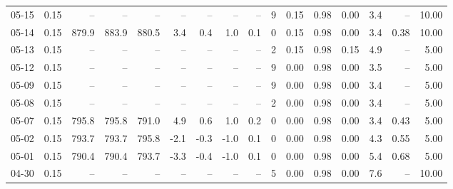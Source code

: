 \begin{threeparttable}
{\begin{tabular}{lrrrrrrrrrrrrrrr}
  05-15 &     0.15 &    -- &    -- &    -- &         -- &             -- &                       -- &                  -- &              9 &       0.15 &      0.98 &           0.00 &              3.4 &              -- &                  10.00 \\
  05-14 &     0.15 & 879.9 & 883.9 & 880.5 &        3.4 &            0.4 &                      1.0 &                 0.1 &              0 &       0.15 &      0.98 &           0.00 &              3.4 &            0.38 &                  10.00 \\
  05-13 &     0.15 &    -- &    -- &    -- &         -- &             -- &                       -- &                  -- &              2 &       0.15 &      0.98 &           0.15 &              4.9 &              -- &                   5.00 \\
  05-12 &     0.15 &    -- &    -- &    -- &         -- &             -- &                       -- &                  -- &              9 &       0.00 &      0.98 &           0.00 &              3.5 &              -- &                   5.00 \\
  05-09 &     0.15 &    -- &    -- &    -- &         -- &             -- &                       -- &                  -- &              9 &       0.00 &      0.98 &           0.00 &              3.4 &              -- &                   5.00 \\
  05-08 &     0.15 &    -- &    -- &    -- &         -- &             -- &                       -- &                  -- &              2 &       0.00 &      0.98 &           0.00 &              3.4 &              -- &                   5.00 \\
  05-07 &     0.15 & 795.8 & 795.8 & 791.0 &        4.9 &            0.6 &                      1.0 &                 0.2 &              0 &       0.00 &      0.98 &           0.00 &              3.4 &            0.43 &                   5.00 \\
  05-02 &     0.15 & 793.7 & 793.7 & 795.8 &       -2.1 &           -0.3 &                     -1.0 &                 0.1 &              0 &       0.00 &      0.98 &           0.00 &              4.3 &            0.55 &                   5.00 \\
  05-01 &     0.15 & 790.4 & 790.4 & 793.7 &       -3.3 &           -0.4 &                     -1.0 &                 0.1 &              0 &       0.00 &      0.98 &           0.00 &              5.4 &            0.68 &                   5.00 \\
  04-30 &     0.15 &    -- &    -- &    -- &         -- &             -- &                       -- &                  -- &              5 &       0.00 &      0.98 &           0.00 &              7.6 &              -- &                  10.00 \\

\end{tabular}}
\end{threeparttable}
